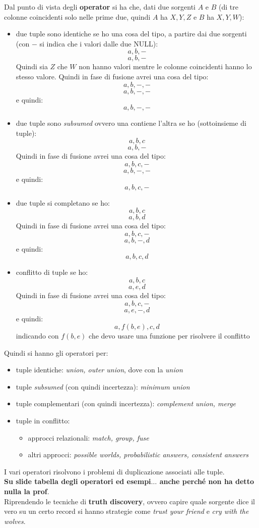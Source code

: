 \documentclass[a4paper,12pt, oneside]{book}
\begin{document}
Dal punto di vista degli \textbf{operator} si ha che, dati due sorgenti $A$ e
$B$ (di tre colonne coincidenti solo nelle prime due, quindi $A$ ha $X,Y,Z$ e
$B$ ha $X,Y,W$): 
\begin{itemize}
  \item due tuple sono identiche se ho una cosa del tipo, a partire dai due
  sorgenti (con $-$ si indica che i valori dalle due NULL): 
  \[a,b,-\]
  \[a,b,-\]
  Quindi sia $Z$ che $W$ non hanno valori mentre le colonne coincidenti hanno lo
  stesso valore. Quindi in fase di fusione avrei una
  cosa del tipo:
  \[a,b,-,-\]
  \[a,b,-,-\]
  e quindi:
  \[a,b,-,-\]
  \item due tuple sono \textit{subsumed} ovvero una contiene l'altra se ho
  (sottoinsieme di tuple):
  \[a,b,c\]
  \[a,b,-\]
  Quindi in fase di fusione avrei una
  cosa del tipo:
  \[a,b,c,-\]
  \[a,b,-,-\]
  e quindi:
  \[a,b,c,-\]
  \item due tuple si completano se ho:
  \[a,b,c\]
  \[a,b,d\]
  Quindi in fase di fusione avrei una
  cosa del tipo:
  \[a,b,c,-\]
  \[a,b,-,d\]
  e quindi:
  \[a,b,c,d\]
  \item conflitto di tuple se ho:
  \[a,b,c\]
  \[a,e,d\]
  Quindi in fase di fusione avrei una
  cosa del tipo:
  \[a,b,c,-\]
  \[a,e,-,d\]
  e quindi:
  \[a,f(b,e),c,d\]
  indicando con $f(b,e)$ che devo usare una funzione per risolvere il conflitto
\end{itemize}
Quindi si hanno gli operatori per:
\begin{itemize}
  \item tuple identiche: \textit{union, outer union}, dove con la \textit{union}
  
  \item tuple \textit{subsumed} (con quindi incertezza): \textit{minimum union}
  \item tuple complementari (con quindi incertezza): \textit{complement union,
    merge} 
  \item tuple in conflitto:
  \begin{itemize}
    \item approcci relazionali: \textit{match, group, fuse}
    \item altri approcci: \textit{possible worlds, probabilistic answers,
      consistent answers} 
  \end{itemize}
\end{itemize}
I vari operatori risolvono i problemi di duplicazione associati alle tuple.\\
\textbf{Su slide tabella degli operatori ed esempi$\ldots$ anche perché non ha
  detto nulla la prof}.\\
Riprendendo le tecniche di \textbf{truth discovery}, ovvero capire quale
sorgente dice il vero su un certo record si hanno strategie come \textit{trust
  your friend} e \textit{cry with the wolves}.
\end{document}
